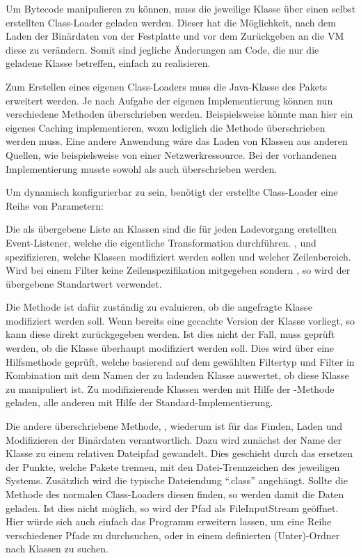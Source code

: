 Um Bytecode manipulieren zu können, muss die jeweilige Klasse über einen selbst erstellten Class-Loader geladen werden. Dieser hat die Möglichkeit, nach dem Laden der Binärdaten von der Festplatte und vor dem Zurückgeben an die \ac{VM} diese zu verändern. Somit sind jegliche Änderungen am Code, die nur die geladene Klasse betreffen, einfach zu realisieren.

Zum Erstellen eines eigenen Class-Loaders muss die Java-Klasse  des  Pakets erweitert werden. Je nach Aufgabe der eigenen Implementierung können nun verschiedene Methoden überschrieben werden. Beispielsweise könnte man hier ein eigenes Caching implementieren, wozu lediglich die  Methode überschrieben werden muss. Eine andere Anwendung wäre das Laden von Klassen aus anderen Quellen, wie beispielsweise von einer Netzwerkressource. Bei der vorhandenen Implementierung musste sowohl  als auch  überschrieben werden.

Um dynamisch konfigurierbar zu sein, benötigt der erstellte Class-Loader eine Reihe von Parametern:



Die als  übergebene Liste an Klassen sind die für jeden Ladevorgang erstellten Event-Listener, welche die eigentliche Transformation durchführen. ,  und  spezifizieren, welche Klassen modifiziert werden sollen und welcher Zeilenbereich. Wird bei einem Filter keine Zeilenspezifikation mitgegeben sondern , so wird der übergebene Standartwert verwendet.

Die Methode  ist dafür zuständig zu evaluieren, ob die angefragte Klasse modifiziert werden soll. Wenn bereits eine gecachte Version der Klasse vorliegt, so kann diese direkt zurückgegeben werden. Ist dies nicht der Fall, muss geprüft werden, ob die Klasse überhaupt modifiziert werden soll. Dies wird über eine Hilfsmethode geprüft, welche basierend auf dem gewählten Filtertyp und Filter in Kombination mit dem Namen der zu ladenden Klasse auswertet, ob diese Klasse zu manipuliert ist. Zu modifizierende Klassen werden mit Hilfe der -Methode geladen, alle anderen mit Hilfe der Standard-Implementierung.

Die andere überschriebene Methode, , wiederum ist für das Finden, Laden und Modifizieren der Binärdaten verantwortlich. Dazu wird zunächst der Name der Klasse zu einem relativen Dateipfad gewandelt. Dies geschieht durch das ersetzen der Punkte, welche Pakete trennen, mit den Datei-Trennzeichen des jeweiligen Systems. Zusätzlich wird die typische Dateiendung "`.class"' angehängt. Sollte die Methode  des normalen Class-Loaders diesen finden, so werden damit die Daten geladen. Ist dies nicht möglich, so wird der Pfad als FileInputStream geöffnet. Hier würde sich auch einfach das Programm erweitern lassen, um eine Reihe verschiedener Pfade zu durchsuchen, oder in einem definierten (Unter)-Ordner nach Klassen zu suchen.


